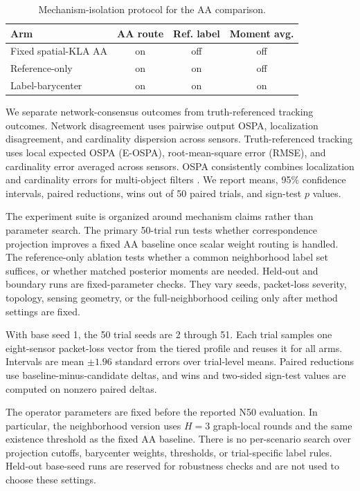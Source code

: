 \documentclass{IEEEtaes}
\begin{document}
\begin{table}[t]
\caption{Mechanism-isolation protocol for the AA comparison.}
\label{tab:design}
\centering
\tablefont
\begingroup
\setlength{\tabcolsep}{3pt}
\begin{tabular}{@{}>{\raggedright\arraybackslash}p{1.05in}ccc@{}}
\toprule
Arm & AA route & Ref. label & Moment avg.\\
\midrule
Fixed spatial-KLA AA & on & off & off\\
Reference-only & on & on & off\\
Label-barycenter & on & on & on\\
\bottomrule
\end{tabular}
\endgroup
\end{table}

We separate network-consensus outcomes from truth-referenced tracking outcomes. Network disagreement uses pairwise output OSPA, localization disagreement, and cardinality dispersion across sensors. Truth-referenced tracking uses local expected OSPA (E-OSPA), root-mean-square error (RMSE), and cardinality error averaged across sensors. OSPA consistently combines localization and cardinality errors for multi-object filters \cite{Schuhmacher2008OSPA}. We report means, 95\% confidence intervals, paired reductions, wins out of 50 paired trials, and sign-test $p$ values.

The experiment suite is organized around mechanism claims rather than parameter search. The primary 50-trial run tests whether correspondence projection improves a fixed AA baseline once scalar weight routing is handled. The reference-only ablation tests whether a common neighborhood label set suffices, or whether matched posterior moments are needed. Held-out and boundary runs are fixed-parameter checks. They vary seeds, packet-loss severity, topology, sensing geometry, or the full-neighborhood ceiling only after method settings are fixed.

With base seed 1, the 50 trial seeds are 2 through 51. Each trial samples one eight-sensor packet-loss vector from the tiered profile and reuses it for all arms. Intervals are mean $\pm1.96$ standard errors over trial-level means. Paired reductions use baseline-minus-candidate deltas, and wins and two-sided sign-test values are computed on nonzero paired deltas.

The operator parameters are fixed before the reported N50 evaluation. In particular, the neighborhood version uses $H=3$ graph-local rounds and the same existence threshold as the fixed AA baseline. There is no per-scenario search over projection cutoffs, barycenter weights, thresholds, or trial-specific label rules. Held-out base-seed runs are reserved for robustness checks and are not used to choose these settings.
\end{document}
